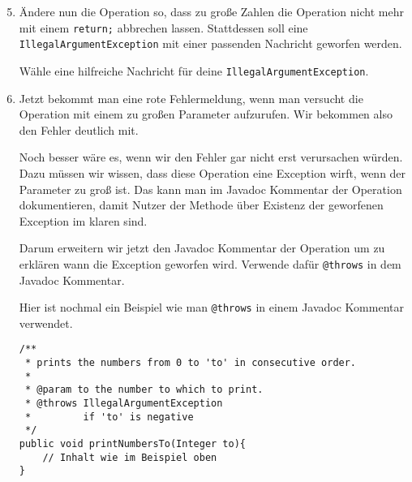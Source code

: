\begin{enumerate}\setcounter{enumi}{4}
	\item
		Ändere nun die Operation so, dass zu große Zahlen die Operation nicht mehr mit einem \lstinline{return;} abbrechen lassen.
		Stattdessen soll eine \lstinline{IllegalArgumentException} mit einer passenden Nachricht geworfen werden.

		Wähle eine hilfreiche Nachricht für deine \lstinline{IllegalArgumentException}.

	\item
		Jetzt bekommt man eine rote Fehlermeldung, wenn man versucht die Operation mit einem zu großen Parameter aufzurufen.
		Wir bekommen also den Fehler deutlich mit.

		Noch besser wäre es, wenn wir den Fehler gar nicht erst verursachen würden.
		Dazu müssen wir wissen, dass diese Operation eine Exception wirft, wenn der Parameter zu groß ist.
		Das kann man im Javadoc Kommentar der Operation dokumentieren, damit Nutzer der Methode über Existenz der geworfenen Exception im klaren sind.

		Darum erweitern wir jetzt den Javadoc Kommentar der Operation um zu erklären wann die Exception geworfen wird.
		Verwende dafür \lstinline{@throws} in dem Javadoc Kommentar.

		Hier ist nochmal ein Beispiel wie man \lstinline{@throws} in einem Javadoc Kommentar verwendet.

		\begin{lstlisting}
/**
 * prints the numbers from 0 to 'to' in consecutive order.
 *
 * @param to the number to which to print.
 * @throws IllegalArgumentException
 *         if 'to' is negative
 */
public void printNumbersTo(Integer to){
    // Inhalt wie im Beispiel oben
}
		\end{lstlisting}
\end{enumerate}
\newpage
